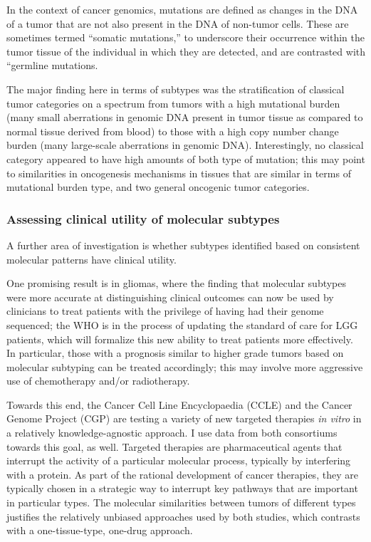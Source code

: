         In the context of cancer genomics, mutations are defined as changes in the DNA of a
        tumor that are not also present in the DNA of non-tumor
        cells. These are sometimes termed ``somatic mutations,'' to
        underscore their occurrence within the tumor tissue of the
        individual in which they are detected, and are contrasted with
        ``germline mutations.


        The major finding here in terms of subtypes was the stratification of
        classical tumor categories on a spectrum from tumors with a high
        mutational burden (many small aberrations in genomic DNA present in
        tumor tissue as compared to normal tissue derived from blood) to those
        with a high copy number change burden (many large-scale aberrations in
        genomic DNA). Interestingly, no classical category appeared to have
        high amounts of both type of mutation; this may point to similarities
        in oncogenesis mechanisms in tissues that are similar in terms of
        mutational burden type, and two general oncogenic tumor
        categories.
        
        \subsubsection{Assessing clinical utility of molecular subtypes}

        A further area of investigation is whether subtypes identified
        based on consistent molecular patterns have clinical utility.

        
        One promising result is in gliomas, where the finding that molecular subtypes were more
        accurate at distinguishing clinical outcomes can now be used by
        clinicians to treat patients with the privilege of having had
        their genome sequenced; the WHO is in the process of updating
        the standard of care for LGG patients, which will formalize
        this new ability to treat patients more effectively. In
        particular, those with a prognosis similar to higher grade
      tumors based on molecular subtyping can be treated
        accordingly; this may involve more aggressive use of
        chemotherapy and/or radiotherapy.

        Towards this end, the Cancer Cell Line
        Encyclopaedia (CCLE)\cite{barretina_cancer_2012} and the Cancer
        Genome Project (CGP) \cite{garnett_systematic_2012}are testing a variety
        of new targeted therapies \textit{in vitro} in a relatively knowledge-agnostic
        approach. I use data from both consortiums towards this goal,
        as well. Targeted therapies are pharmaceutical agents that
        interrupt the activity of a particular molecular process,
        typically by interfering with a protein. As part of the
        rational development of cancer therapies, they are typically
        chosen in a strategic way to interrupt key pathways that are
        important in particular types. The molecular similarities
        between tumors of different types justifies the relatively
        unbiased approaches used by both studies, which contrasts with
        a one-tissue-type, one-drug approach.
        

